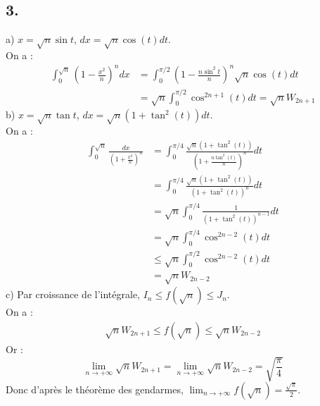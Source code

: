 \documentclass[10pt]{article}
\begin{document}
\subsection*{3.}
\begin{tcolorbox}[enhanced, width=7in, center, size=fbox, fontupper=\large, drop shadow southwest]
    a) $x = \sqrt{n}\sin t$, $dx = \sqrt{n}\cos(t) dt$.\\
    On a :
    \begin{align*}
        \int_0^{\sqrt{n}}{\left(1-\frac{x^2}{n}\right)^ndx}&=\int_0^{\pi/2}{\left( 1-\frac{n\sin^2t}{n} \right)^n\sqrt{n}\cos(t)dt}\\
        &=\sqrt{n}\int_0^{\pi/2}{\cos^{2n+1}(t)dt}=\sqrt{n}W_{2n+1}
    \end{align*}
    b) $x = \sqrt{n}\tan t$, $dx = \sqrt{n}(1+\tan^2(t)) dt$.\\
    On a :
    \begin{align*}
        \int_0^{\sqrt{n}}{\frac{dx}{\left( 1 + \frac{x^2}{n} \right)^n}} &= \int_0^{\pi/4}{\frac{\sqrt{n}(1+\tan^2(t))}{(1+\frac{n\tan^2(t)}{n})^n}dt}\\
        &=\int_0^{\pi/4}{\frac{\sqrt{n}(1+\tan^2(t))}{(1+\tan^2(t))^n}dt}\\
        &=\sqrt{n}\int_0^{\pi/4}{\frac{1}{(1+\tan^2(t))^{n-1}}dt}\\
        &=\sqrt{n}\int_0^{\pi/4}{\cos^{2n-2}(t)dt}\\
        &\leq \sqrt{n}\int_0^{\pi/2}\cos^{2n-2}(t)dt\\
        &= \sqrt{n}W_{2n-2}
    \end{align*}
    c) Par croissance de l'intégrale, $I_n \leq f(\sqrt{n}) \leq J_n$.\\
    On a :
    \begin{align*}
        \sqrt{n}W_{2n+1} \leq f(\sqrt{n}) \leq \sqrt{n}W_{2n-2}
    \end{align*}
    Or :
    \begin{equation*}
        \lim_{n\to+\infty}{\sqrt{n}W_{2n+1}}=\lim_{n\to+\infty}{\sqrt{n}W_{2n-2}}=\sqrt{\frac{\pi}{4}}
    \end{equation*}
    Donc d'après le théorème des gendarmes, $\lim_{n\to+\infty}f(\sqrt{n})=\frac{\sqrt{\pi}}{2}$.
\end{tcolorbox}
\end{document}
